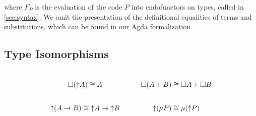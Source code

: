 where $F_P$ is the evaluation of the code $P$ into endofunctors on types, called
   in \cref{sec:syntax}. We omit the presentation of the
definitional equalities of terms and substitutions, which can be found
in our Agda formalization.

\subsection*{Type Isomorphisms}
\[\arraycolsep=15pt\def\arraystretch{2.8}
\begin{array}{cc}
\square(\up A) \cong A & \square(A + B) \cong \square A + \square B \\
\up(A \to B) \cong \up A \to \up B & \up(\mu P) \cong \mu(\up P)
\end{array}
\]



%